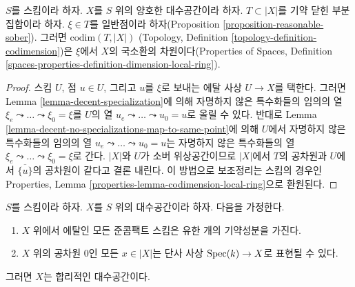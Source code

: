 \begin{lemma}
\label{lemma-codimension-local-ring}
$S$를 스킴이라 하자. $X$를 $S$ 위의 양호한 대수공간이라 하자.
$T \subset |X|$를 기약 닫힌 부분집합이라 하자. $\xi \in T$를
일반점이라 하자(Proposition \ref{proposition-reasonable-sober}).
그러면 $\text{codim}(T, |X|)$
(Topology, Definition \ref{topology-definition-codimension})은
$\xi$에서 $X$의 국소환의 차원이다(Properties of Spaces, Definition
\ref{spaces-properties-definition-dimension-local-ring}).
\end{lemma}

\begin{proof}
스킴 $U$, 점 $u \in U$, 그리고 $u$를 $\xi$로 보내는 에탈 사상
$U \to X$를 택한다. 그러면 Lemma \ref{lemma-decent-specialization}에
의해 자명하지 않은 특수화들의 임의의 열
$\xi_e \leadsto \ldots \leadsto \xi_0 = \xi$를 $U$의 열
$u_e \leadsto \ldots \leadsto u_0 = u$로 올릴 수 있다.
반대로 Lemma \ref{lemma-decent-no-specializations-map-to-same-point}에
의해 $U$에서 자명하지 않은 특수화들의 임의의 열
$u_e \leadsto \ldots \leadsto u_0 = u$는 자명하지 않은 특수화들의 열
$\xi_e \leadsto \ldots \leadsto \xi_0 = \xi$로 간다.
$|X|$와 $U$가 소버 위상공간이므로 $|X|$에서 $T$의 공차원과
$U$에서 $\overline{\{u\}}$의 공차원이 같다고 결론 내린다.
이 방법으로 보조정리는 스킴의 경우인 Properties, Lemma
\ref{properties-lemma-codimension-local-ring}으로 환원된다.
\end{proof}

\begin{lemma}
\label{lemma-get-reasonable}
$S$를 스킴이라 하자. $X$를 $S$ 위의 대수공간이라 하자. 다음을
가정한다.
\begin{enumerate}
\item $X$ 위에서 에탈인 모든 준콤팩트 스킴은 유한 개의 기약성분을
가진다.
\item $X$ 위의 공차원 $0$인 모든 $x \in |X|$는 단사 사상
$\mathop{\mathrm{Spec}}(k) \to X$로 표현될 수 있다.
\end{enumerate}
그러면 $X$는 합리적인 대수공간이다.
\end{lemma}

